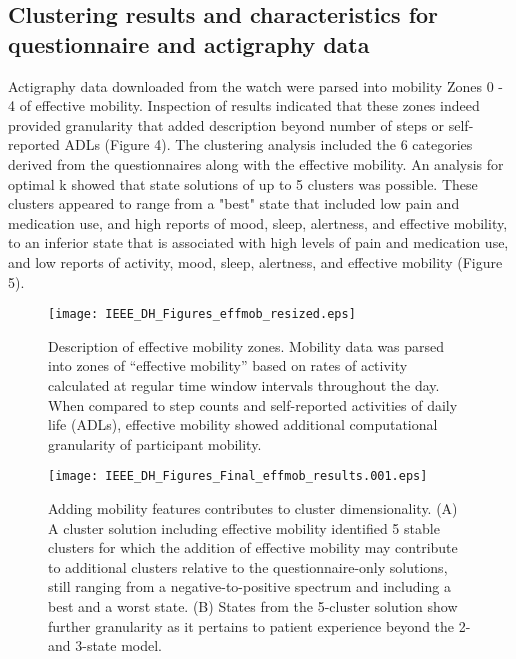 \documentclass[conference]{IEEEtran}
\begin{document}
\subsection{Clustering results and characteristics for questionnaire and actigraphy data}
Actigraphy data downloaded from the watch were parsed into mobility Zones 0 - 4 of effective mobility. Inspection of results indicated that these zones indeed provided granularity that added description beyond number of steps or self-reported ADLs (Figure 4). The clustering analysis included the 6 categories derived from the questionnaires along with the effective mobility. An analysis for optimal k showed that state solutions of up to 5 clusters was possible. These clusters appeared to range from a "best" state that included low pain and medication use, and high reports of mood, sleep, alertness, and effective mobility, to an inferior state that is associated with high levels of pain and medication use, and low reports of activity, mood, sleep, alertness, and effective mobility (Figure 5).  

\begin{figure}[htbp]
\centerline{\texttt{[image: IEEE\_DH\_Figures\_effmob\_resized.eps]}}
\caption{Description of effective mobility zones. Mobility data was parsed into zones of “effective mobility” based on rates of activity calculated at regular time window intervals throughout the day. When compared to step counts and self-reported activities of daily life (ADLs), effective mobility showed additional computational granularity of participant mobility.}
\label{fig}
\end{figure}


\begin{figure}[htbp]
\centerline{\texttt{[image: IEEE\_DH\_Figures\_Final\_effmob\_results.001.eps]}}
\caption{Adding mobility features contributes to cluster dimensionality. (A) A cluster solution including effective mobility identified 5 stable clusters for which the addition of effective mobility may contribute to additional clusters relative to the questionnaire-only solutions, still ranging from a negative-to-positive spectrum and including a best and a worst state. (B) States from the 5-cluster solution show further granularity as it pertains to patient experience beyond the 2- and 3-state model.}
\label{fig}
\end{figure}
\end{document}
